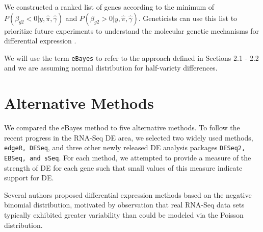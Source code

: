We constructed a ranked list of genes according to the minimum of $P(\beta_{g2}< 0 | y, \hat{\pi}, \hat{\gamma})$ and $P(\beta_{g2}> 0 | y, \hat{\pi}, \hat{\gamma})$. Geneticists can use this list to prioritize future experiments to understand the molecular genetic mechanisms for differential expression \citep{niemi2015empirical}. 

We will use the term {\tt eBayes} to refer to the approach defined in Sections 2.1 - 2.2 and we are assuming normal distribution for half-variety differences.

\section{Alternative Methods}

We compared the eBayes method to five alternative methods. To follow the recent progress in the RNA-Seq DE area, we selected two widely used methods, {\tt edgeR, DESeq}, and three other newly released DE analysis packages {\tt DESeq2, EBSeq, and sSeq}. For each method, we attempted to provide a measure of the strength of DE for each gene such that small values of this measure indicate support for DE. 

Several authors proposed differential expression methods based on the negative binomial distribution, motivated by observation that real RNA-Seq data sets typically exhibited greater variability than could be modeled via the Poisson distribution\citep{lorenz2014using}. 

